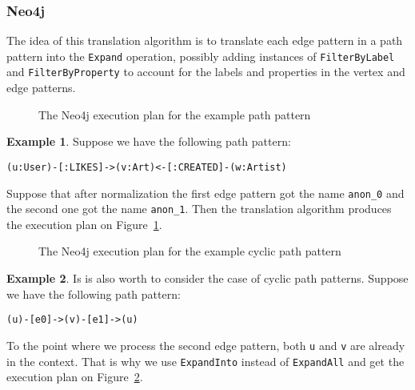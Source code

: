 \documentclass[14pt]{constructor-thesis}
\theoremstyle{definition}
\newtheorem{example}{Example}
\begin{document}
\subsubsection{Neo4j}

The idea of this translation algorithm is to translate each edge pattern in a path pattern into the \texttt{Expand} operation, possibly adding instances of \texttt{FilterByLabel} and \texttt{FilterByProperty} to account for the labels and properties in the vertex and edge patterns.

\begin{figure}
  
  \caption{The Neo4j execution plan for the example path pattern}
  \label{fig:neo4j-execution-plan}
\end{figure}

\begin{example}
  Suppose we have the following path pattern:

  \verb+(u:User)-[:LIKES]->(v:Art)<-[:CREATED]-(w:Artist)+

  Suppose that after normalization the first edge pattern got the name \texttt{anon\_0} and the second one got the name \texttt{anon\_1}. Then the translation algorithm produces the execution plan on Figure~\ref{fig:neo4j-execution-plan}.
\end{example}

\begin{figure}
  
  \caption{The Neo4j execution plan for the example cyclic path pattern}
  \label{fig:neo4j-execution-plan-cyclic}
\end{figure}

\begin{example}
  Is is also worth to consider the case of cyclic path patterns. Suppose we have the following path pattern:

  \verb+(u)-[e0]->(v)-[e1]->(u)+

  To the point where we process the second edge pattern, both \texttt{u} and \texttt{v} are already in the context. That is why we use \texttt{ExpandInto} instead of \texttt{ExpandAll} and get the execution plan on Figure~\ref{fig:neo4j-execution-plan-cyclic}.
\end{example}
\end{document}
